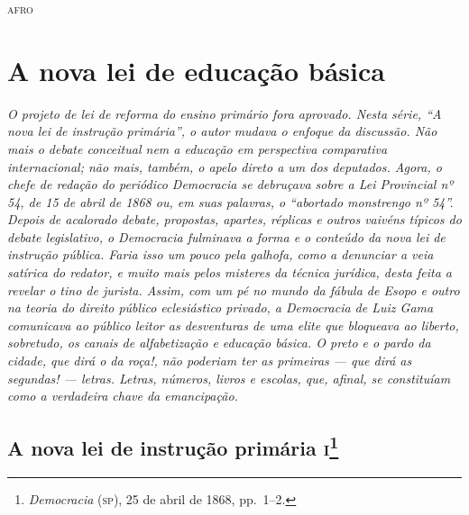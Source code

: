 \begin{flushright}
\textsc{afro}
\end{flushright}

\part{A nova lei de educação básica}

\begin{argumento}\itshape
O projeto de lei de reforma do ensino primário fora aprovado. Nesta
série, ``A nova lei de instrução primária'', o autor mudava o
enfoque da discussão. Não mais o debate conceitual nem a educação em
perspectiva comparativa internacional; não mais, também, o apelo direto
a um dos deputados. Agora, o chefe de redação do periódico \textnormal{Democracia}
se debruçava sobre a Lei Provincial nº 54, de 15 de abril de 1868 ou, em
suas palavras, o ``abortado monstrengo nº 54''. Depois de acalorado
debate, propostas, apartes, réplicas e outros vaivéns típicos do debate
legislativo, o \textnormal{Democracia} fulminava a forma e o conteúdo da nova
lei de instrução pública. Faria isso um pouco pela galhofa, como a
denunciar a veia satírica do redator, e muito mais pelos misteres da
técnica jurídica, desta feita a revelar o tino de jurista. Assim, com um
pé no mundo da fábula de Esopo e outro na teoria do direito público
eclesiástico privado, a \textnormal{Democracia} de Luiz Gama comunicava ao
público leitor as desventuras de uma elite que bloqueava ao liberto,
sobretudo, os canais de alfabetização e educação básica. O preto e o
pardo da cidade, que dirá o da roça!, não poderiam ter as primeiras ---
que dirá as segundas! --- letras. Letras, números, livros e escolas, que,
afinal, se constituíam como a verdadeira chave da emancipação.
\end{argumento}

\chapter{A nova lei de instrução primária \textsc{i}\footnote{\emph{Democracia} (\textsc{sp}), 25 de abril de 1868, pp.~1--2.}}

